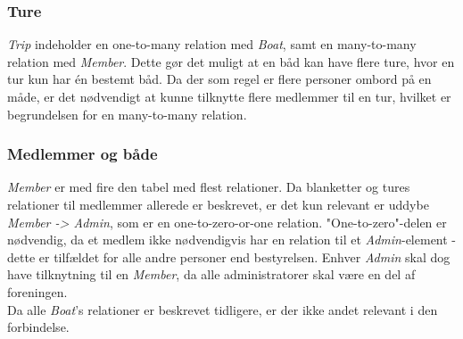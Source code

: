 \subsubsection*{Ture}
\textit{Trip} indeholder en one-to-many relation med \textit{Boat}, samt en many-to-many relation med \textit{Member}. Dette gør det muligt at en båd kan have flere ture, hvor en tur kun har én bestemt båd. Da der som regel er flere personer ombord på en måde, er det nødvendigt at kunne tilknytte flere medlemmer til en tur, hvilket er begrundelsen for en many-to-many relation.

\subsubsection*{Medlemmer og både}
\textit{Member} er med fire den tabel med flest relationer. Da blanketter og tures relationer til medlemmer allerede er beskrevet, er det kun relevant er uddybe \textit{Member -> Admin}, som er en one-to-zero-or-one relation. "One-to-zero"\mbox{}-delen er nødvendig, da et medlem ikke nødvendigvis har en relation til et \textit{Admin}-element - dette er tilfældet for alle andre personer end bestyrelsen. Enhver \textit{Admin} skal dog have tilknytning til en \textit{Member}, da alle administratorer skal være en del af foreningen.\\

Da alle \textit{Boat}'s relationer er beskrevet tidligere, er der ikke andet relevant i den forbindelse.


